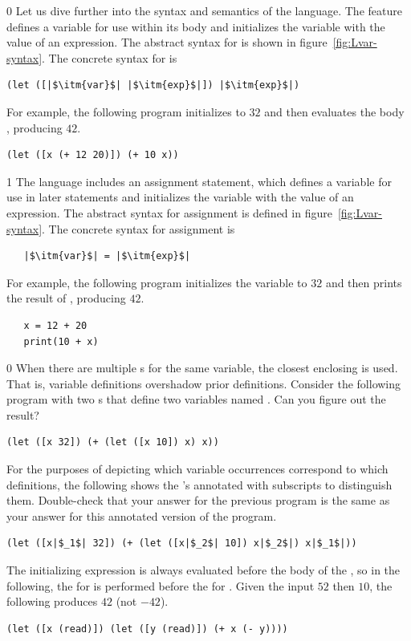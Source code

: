 \documentclass[7x10]{TimesAPriori_MIT}%
\def\racketEd{0}
\def\pythonEd{1}
\def\edition{1}
\newcommand{\pythonColor}[0]{}
\numberwithin{theorem}{chapter}
\numberwithin{definition}{chapter}
\numberwithin{equation}{chapter}
\begin{document}
{\if\edition\racketEd
Let us dive further into the syntax and semantics of the \LangVar{}
language.  The  feature defines a variable for use within its
body and initializes the variable with the value of an expression.
The abstract syntax for  is shown in
figure~\ref{fig:Lvar-syntax}.  The concrete syntax for  is
\begin{lstlisting}
(let ([|$\itm{var}$| |$\itm{exp}$|]) |$\itm{exp}$|)
\end{lstlisting}
For example, the following program initializes  to $32$ and then
evaluates the body , producing $42$.
\begin{lstlisting}
(let ([x (+ 12 20)]) (+ 10 x))
\end{lstlisting}
\fi}
%
{\if\edition\pythonEd\pythonColor
%
The \LangVar{} language includes an assignment statement, which defines a
variable for use in later statements and initializes the variable with
the value of an expression.  The abstract syntax for assignment is
defined in figure~\ref{fig:Lvar-syntax}.  The concrete syntax for
assignment is 
\begin{lstlisting}
   |$\itm{var}$| = |$\itm{exp}$|
\end{lstlisting}
For example, the following program initializes the variable 
to $32$ and then prints the result of , producing $42$.
\begin{lstlisting}
   x = 12 + 20
   print(10 + x)
\end{lstlisting}
\fi}

{\if\edition\racketEd
%  
When there are multiple s for the same variable, the closest
enclosing  is used. That is, variable definitions overshadow
prior definitions. Consider the following program with two s
that define two variables named . Can you figure out the
result?
\begin{lstlisting}
(let ([x 32]) (+ (let ([x 10]) x) x))
\end{lstlisting}
For the purposes of depicting which variable occurrences correspond to
which definitions, the following shows the 's annotated with
subscripts to distinguish them. Double-check that your answer for the
previous program is the same as your answer for this annotated version
of the program.
\begin{lstlisting}
(let ([x|$_1$| 32]) (+ (let ([x|$_2$| 10]) x|$_2$|) x|$_1$|))
\end{lstlisting}
The initializing expression is always evaluated before the body of the
, so in the following, the  for  is
performed before the  for . Given the input
$52$ then $10$, the following produces $42$ (not $-42$).
\begin{lstlisting}
(let ([x (read)]) (let ([y (read)]) (+ x (- y))))
\end{lstlisting}
\fi}
\end{document}
